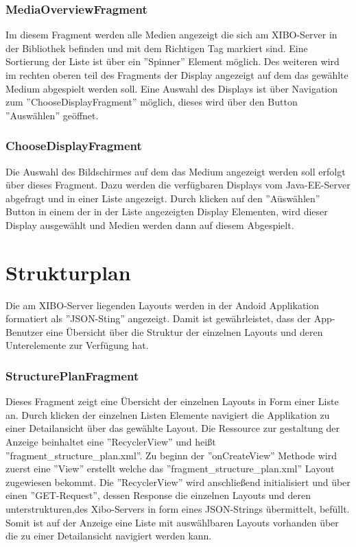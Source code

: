 \subsubsection{MediaOverviewFragment}
Im diesem Fragment werden alle Medien angezeigt die sich am XIBO-Server in der Bibliothek befinden und mit dem Richtigen Tag markiert sind. Eine Sortierung der Liste ist über ein ''Spinner'' Element möglich. Des weiteren wird im rechten oberen teil des Fragments der Display angezeigt auf dem das gewählte Medium abgespielt werden soll. Eine Auswahl des Displays ist über Navigation zum ''ChooseDisplayFragment'' möglich, dieses wird über den Button ''Auswählen'' geöffnet.
\subsubsection{ChooseDisplayFragment}
Die Auswahl des Bildschirmes auf dem das Medium angezeigt werden soll erfolgt über dieses Fragment. Dazu werden die verfügbaren Displays vom Java-EE-Server abgefragt und in einer Liste angezeigt. Durch klicken auf den ''Aüswählen'' Button in einem der in der Liste angezeigten Display Elementen, wird dieser Display ausgewählt und Medien werden dann auf diesem Abgespielt. 
\section{Strukturplan}
Die am XIBO-Server liegenden Layouts werden in der Andoid Applikation formatiert als ''JSON-Sting'' angezeigt. Damit ist gewährleistet, dass der App-Benutzer eine Übersicht über die Struktur der einzelnen Layouts und deren Unterelemente zur Verfügung hat.
\subsubsection{StructurePlanFragment}
Dieses Fragment zeigt eine Übersicht der einzelnen Layouts in Form einer Liste an. Durch klicken der einzelnen Listen Elemente navigiert die Applikation zu einer Detailansicht über das gewählte Layout.
Die Ressource zur gestaltung der Anzeige beinhaltet eine ''RecyclerView'' und heißt ''fragment\_structure\_plan.xml''. Zu beginn der ''onCreateView'' Methode wird zuerst eine ''View'' erstellt welche das ''fragment\_structure\_plan.xml'' Layout zugewiesen bekommt. Die ''RecyclerView'' wird anschließend initialisiert und über einen ''GET-Request'', dessen Response die einzelnen Layouts und deren unterstrukturen,des Xibo-Servers in form eines JSON-Strings übermittelt, befüllt. Somit ist auf der Anzeige eine Liste mit auswählbaren Layouts vorhanden über die zu einer Detailansicht navigiert werden kann. 
